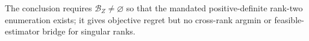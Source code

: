 The conclusion requires \(\mathcal B_Z\ne\varnothing\) so that the mandated positive-definite rank-two enumeration exists; it gives objective regret but no cross-rank argmin or feasible-estimator bridge for singular ranks.